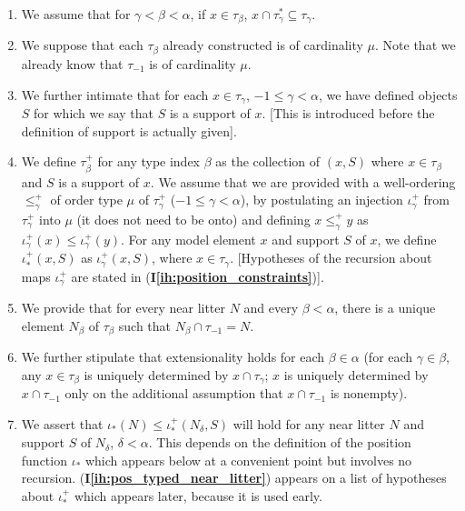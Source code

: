 \documentclass[112pt]{article}
\theoremstyle{definition}
\theoremstyle{remark}
\newcommand{\ihref}[1]{(\textbf{I\ref{#1}})}
\begin{document}
\begin{enumerate}

\renewcommand{\labelenumi}{(\textbf{I\theenumi})}

\item \label{ih:subset_tau} We assume that for $\gamma<\beta<\alpha$, if $x \in \tau_\beta$, $x \cap \tau^*_\gamma \subseteq \tau_\gamma$.

\item \label{ih:cardinality} We suppose that each $\tau_\beta$ already constructed is of cardinality $\mu$.  Note that we already know that
$\tau_{-1}$ is of cardinality $\mu$.

\item \label{ih:supports} We further intimate that for each $x \in \tau_\gamma$, $-1\leq \gamma<\alpha$, we have defined objects $S$ for which we say that $S$ is a support of $x$.  [This is introduced before the definition of support is actually given].

\item \label{ih:position} We define $\tau_\beta^+$ for any type index $\beta$ as the collection of $(x,S)$ where $x \in \tau_\beta$ and $S$ is a support of $x$.  We assume that we are provided with  a well-ordering $\leq^+_\gamma$ of order type $\mu$ of $\tau_\gamma^+$ ($-1 \leq \gamma <\alpha$), by postulating an injection $\iota^+_\gamma$ from $\tau_\gamma^+$ into $\mu$ (it does not need to be onto) and defining $x \leq^+_\gamma y$ as $\iota^+_\gamma(x) \leq \iota^+_\gamma(y)$.    For any model element $x$ and support $S$ of $x$, we define $\iota^+_*(x,S)$ as $\iota^+_\gamma(x,S)$, where $x \in \tau_\gamma$.    [Hypotheses of the recursion about maps $\iota^+_\gamma$ are stated {in \ihref{ih:position_constraints}}].

\item \label{ih:typed_near_litter} We provide that for every near litter $N$ and every $\beta<\alpha$, there is a unique element $N_\beta$ of $\tau_\beta$ such that $N_\beta \cap \tau_{-1}=N$.

\item \label{ih:extensionality} We further stipulate that extensionality holds for each $\beta\in \alpha$ (for each $\gamma\in \beta$, any $x \in \tau_\beta$ is uniquely determined by $x \cap \tau_\gamma$;  $x$ is uniquely determined by $x \cap \tau_{-1}$ only on the additional assumption that $x \cap \tau_{-1}$ is nonempty).

\item \label{ih:pos_typed_near_litter} We assert that $\iota_*(N) \leq \iota_*^+(N_\delta,S)$ will hold for any near litter $N$ and support $S$ of $N_\delta$, $\delta<\alpha$.  This depends on the definition
of the position function $\iota_*$ which appears below at a convenient point but involves no recursion.  \ihref{ih:pos_typed_near_litter} appears on a list of hypotheses about $\iota_*^+$ which appears later, because it is used early.


\end{enumerate}
\end{document}
